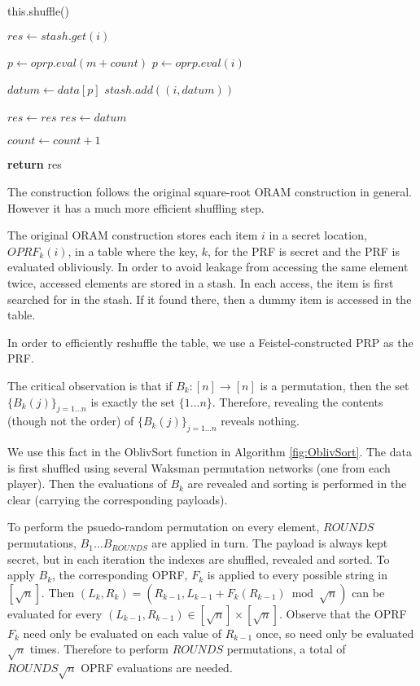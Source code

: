 \begin{algorithm}
\begin{algorithmic}[1]


    \State this.shuffle()
\EndIf

\State $res \gets stash.get(i)$

    \State $p \gets oprp.eval(m + count)$
\Else
    \State $p \gets oprp.eval(i)$
\EndIf

\State $datum \gets data[p]$
\State $stash.add((i, datum))$

    \State $res \gets res$
\Else
    \State $res \gets datum$
\EndIf

\State $count \gets count + 1$ 

\State \textbf{return} res
\EndProcedure

\end{algorithmic}
\end{algorithm}


The construction follows the original square-root ORAM construction
\cite{ostrovsky1997private} in general. 
However it has a much more efficient shuffling step.

The original ORAM construction stores each item $i$
in a secret location, $OPRF_k(i)$, in a table where
the key, $k$, for the PRF is secret and the PRF is evaluated obliviously.
In order to avoid leakage from accessing the same element twice,
accessed elements are stored in a stash. 
In each access, the item is first searched for in the stash.
If it found there, then a dummy item is accessed in the table.

In order to efficiently reshuffle the table, we use a Feistel-constructed
PRP as the PRF.

The critical observation is that if $B_k : [n] \rightarrow [n]$ is a permutation, 
then the set $\{B_k(j) \}_{j=1 \ldots n}$ is exactly the set $\{1 \ldots n\}$.
Therefore, revealing the contents (though not the order) of
$\{B_k(j)\}_{j=1 \ldots n}$ reveals nothing.

We use this fact in the OblivSort function in Algorithm \ref{fig:OblivSort}.
The data is first shuffled using several Waksman permutation networks
(one from each player).
Then the evaluations of $B_k$ are revealed and sorting is performed in the clear
(carrying the corresponding payloads).

To perform the psuedo-random permutation on every element, 
$ROUNDS$ permutations, $B_1 \ldots B_{ROUNDS}$ are applied in turn.
The payload is always kept secret, 
but in each iteration the indexes are shuffled, revealed and sorted.
To apply $B_k$, the corresponding OPRF, $F_k$ is applied to every possible string
in $[\sqrt{n}]$. 
Then $(L_k, R_k) = (R_{k-1}, L_{k-1} + F_k(R_{k-1}) \bmod \sqrt{n})$ can 
be evaluated for every $(L_{k-1}, R_{k-1}) \in [\sqrt{n}] \times [\sqrt{n}]$.
Observe that the OPRF $F_k$ need only be evaluated on each value of
$R_{k-1}$ once, so need only be evaluated $\sqrt{n}$ times.
Therefore to perform $ROUNDS$ permutations, a total of $ROUNDS \sqrt{n}$ OPRF
evaluations are needed.



